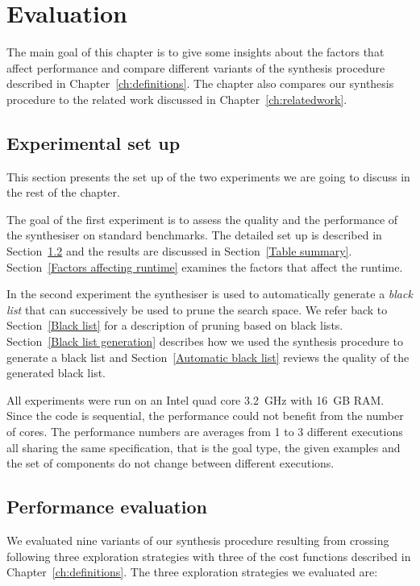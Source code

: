 \lstset{style=plain}

\chapter{Evaluation} \label{ch:evaluation}

The main goal of this chapter is to give some insights about the factors that affect performance and compare different variants of the synthesis procedure described in Chapter~\ref{ch:definitions}. The chapter also compares our synthesis procedure to the related work discussed in Chapter~\ref{ch:relatedwork}.


\section{Experimental set up}
This section presents the set up of the two experiments we are going to discuss in the rest of the chapter.

The goal of the first experiment is to assess the quality and the performance of the synthesiser on standard benchmarks. The detailed set up is described in Section~\ref{Evaluation on benchmarks} and the results are discussed in Section~\ref{Table summary}. Section~\ref{Factors affecting runtime} examines the factors that affect the runtime.

In the second experiment the synthesiser is used to automatically generate a \emph{black list} that can successively be used to prune the search space. We refer back to Section~\ref{Black list} for a description of pruning based on black lists. Section~\ref{Black list generation} describes how we used the synthesis procedure to generate a black list and Section~\ref{Automatic black list} reviews the quality of the generated black list.

All experiments were run on an Intel quad core 3.2~GHz with 16~GB RAM. Since the code is sequential, the performance could not benefit from the number of cores. The performance numbers are averages from 1 to 3 different executions all sharing the same specification, that is the goal type, the given examples and the set of components do not change between different executions.

\section{Performance evaluation}\label{Evaluation on benchmarks}

We evaluated nine variants of our synthesis procedure resulting from crossing following three exploration strategies with three of the cost functions described in Chapter~\ref{ch:definitions}. The three exploration strategies we evaluated are:

